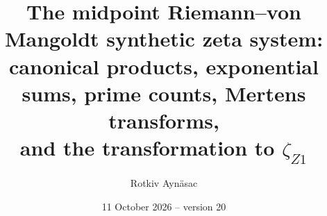 \documentclass[11pt,reqno]{amsart}
\numberwithin{equation}{section}
\theoremstyle{plain}
\theoremstyle{definition}
\theoremstyle{remark}
\begin{document}
\title[The midpoint RVM synthetic zeta system]{The midpoint Riemann--von Mangoldt synthetic zeta system:\\
canonical products, exponential sums, prime counts, Mertens transforms,\\
and the transformation to $\zeta_{Z1}$}
\author{Rotkiv Ayn\"asac\\[2pt]\mbox{}}
\date{11 October 2026 -- version 20}

\makeatletter
\renewenvironment{abstract}{\par\begingroup\small\noindent{\scshape Abstract.}\enspace\ignorespaces}{\par\endgroup\medskip}
\makeatother


\maketitle
{}
\end{document}
